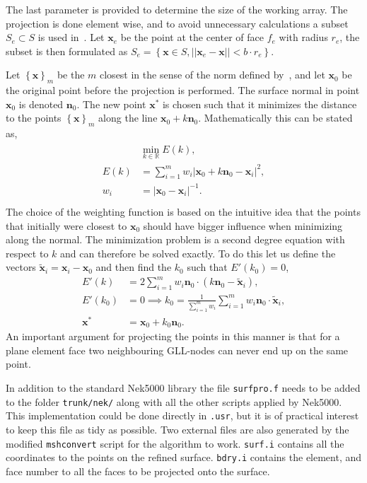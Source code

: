 The last parameter is provided to determine the size of the working array. 
The projection is done element wise, and to avoid unnecessary calculations a subset $S_e \subset S$
is used in~.
Let $\mathbf{x}_e$ be the point at the center of face $f_e$
with radius $r_e$, the subset is then formulated as  
$S_e = \left\{ \mathbf{x} \in S , ||\mathbf{x}_e-\mathbf{x}|| < b \cdot r_e \right\}$.

Let $\left\{ \mathbf{x} \right\}_m$ be the $m$ closest in the sense of the norm defined by~,
and let $\mathbf{x}_0$ be the original point before the projection is performed. The surface normal in point
$\mathbf{x}_0$ is denoted $\mathbf{n}_0$. The new point $\mathbf{x}^*$ is chosen such that it minimizes the distance 
to the points $\left\{ \mathbf{x} \right\}_m$ along the line $\mathbf{x}_0+k\mathbf{n}_0$. Mathematically this can be stated as, 
\begin{align}
    \begin{split}
    &\min_{k\in \mathbb{R}} E(k), \\
    E(k) &= \sum_{i=1}^{m}w_i|\mathbf{x}_0+k\mathbf{n}_0-\mathbf{x}_i|^2, \\ 
    w_i &= |\mathbf{x}_0-\mathbf{x}_i|^{-1}. \\
    \end{split}
    \label{eq:minprob}
\end{align}
The choice of the weighting function is based on the intuitive idea that the points that initially 
were closest to $\mathbf{x}_0$ should have bigger influence when minimizing along the normal.
The minimization problem is a second degree equation with respect to $k$ and can therefore be solved exactly. 
To do this let us define the vectors $\mathbf{\tilde x}_i=\mathbf{x}_i-\mathbf{x}_0$ and then find the $k_0$ such that $E'(k_0) = 0$,
%
\begin{align}
    E'(k) &= 2 \sum_{i=1}^m w_i \mathbf{n}_0 \cdot (k \mathbf{n}_0 - \mathbf{\tilde x}_i),\\
    E'(k_0) &= 0 \implies k_0 = \frac{1}{\sum_{i=1}^m w_i}\sum_{i=1}^m w_i \mathbf{n}_0 \cdot \mathbf{\tilde x}_i,\\
    \mathbf{x}^{*} &= \mathbf{x}_0 + k_0 \mathbf{n}_0.
    \label{eq:minimizing}
\end{align}
%
An important argument for projecting the points in this manner is that for a plane element face two 
neighbouring GLL-nodes can never end up on the same point. 

In addition to the standard Nek5000 library the file \verb|surfpro.f| needs to be added to 
the folder \verb|trunk/nek/| along with all the other scripts applied by Nek5000.
This implementation could be done directly in \verb|.usr|, but it is of practical 
interest to keep this file as tidy as possible.
Two external files are also generated by the modified \verb|mshconvert| script for the algorithm to work.
\verb|surf.i| contains all the coordinates to the points on the refined surface. 
\verb|bdry.i| contains the element, and face number to all the faces to be projected onto the surface.

